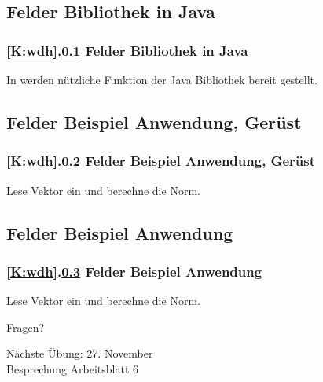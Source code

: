 \documentclass[c,18pt]{beamer}
\begin{document}
\def\stitle{Felder Bibliothek in Java}
\subsection{\stitle}\label{S:bequem}
\begin{frame}[t]%
  \frametitle{\ref{K:wdh}.\ref{S:bequem} \stitle}
\medskip

In  werden n\"utzliche Funktion der Java Bibliothek bereit gestellt.


\end{frame}


\def\stitle{Felder Beispiel Anwendung, Ger\"ust}
\subsection{\stitle}\label{S:BeispielG}
\begin{frame}[t]%
  \frametitle{\ref{K:wdh}.\ref{S:BeispielG} \stitle}
\medskip

Lese Vektor ein und berechne die Norm.


\end{frame}


\def\stitle{Felder Beispiel Anwendung}
\subsection{\stitle}\label{S:Beispiel}
\begin{frame}[t]%
  \frametitle{\ref{K:wdh}.\ref{S:Beispiel} \stitle}
\medskip

Lese Vektor ein und berechne die Norm.


\end{frame}


\setcounter{exercise}{17}

\setcounter{exercise}{18}

\setcounter{exercise}{19}


\begin{frame}
\centering
\Huge\textcolor{KITgreen}{Fragen?}
\vspace{2cm}

{\LARGE
N\"achste \"Ubung: 27. November\\
Besprechung Arbeitsblatt 6
}
\end{frame}


\end{document}
